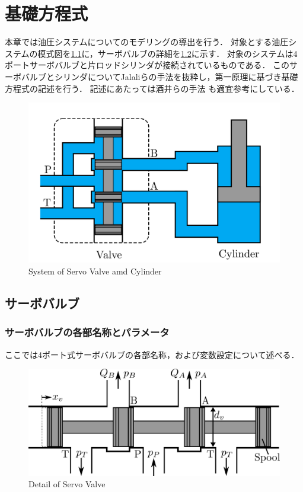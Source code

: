 \chapter{基礎方程式}
本章では油圧システムについてのモデリングの導出を行う．
対象とする油圧システムの模式図を\figname\ref{fig:valve-cylinder}に，サーボバルブの詳細を\figname\ref{fig:valve}に示す．
対象のシステムは4ポートサーボバルブと片ロッドシリンダが接続されているものである．
このサーボバルブとシリンダについてJalaliら\cite{jelali2012hydraulic}の手法を抜粋し，第一原理に基づき基礎方程式の記述を行う．
記述にあたっては酒井らの手法\cite{前島祐三2011,前島祐三2014} も適宜参考にしている．
\begin{figure}[t]
    \centering
        \includegraphics[keepaspectratio, scale=1.0]{contents/FundamentalEquation/figure/valve-cylinder.png}
        \caption{System of Servo Valve amd Cylinder}
        \label{fig:valve-cylinder}
\end{figure}

\section{サーボバルブ}
\subsection{サーボバルブの各部名称とパラメータ}
ここでは4ポート式サーボバルブの各部名称，および変数設定について述べる．
\begin{figure}[t]
    \centering
        \includegraphics[keepaspectratio, scale=1.0]{contents/FundamentalEquation/figure/valve.png}
        \caption{Detail of Servo Valve}
        \label{fig:valve}
\end{figure}
